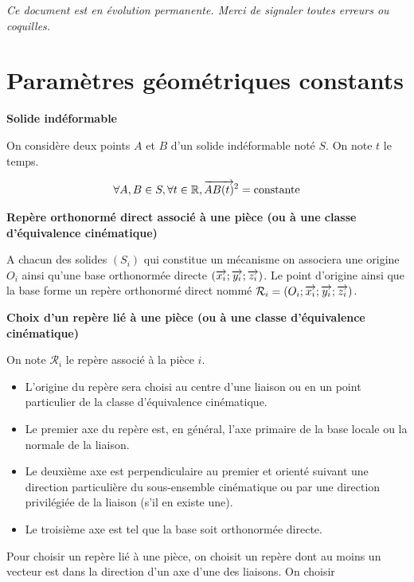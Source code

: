 \documentclass[10pt,oneside]{article}
\begin{document}
\setlength{\parskip}{0ex plus 0.2ex minus 0ex}
 \renewcommand{\contentsname}{}
 \renewcommand{\baselinestretch}{1}



\textit{Ce document est en évolution permanente. Merci de signaler toutes erreurs ou coquilles.}
\tableofcontents

 \renewcommand{\baselinestretch}{1.2}
\setlength{\parskip}{2ex plus 0.5ex minus 0.2ex}



\section{Paramètres géométriques constants}

\begin{defi}
\textbf{Solide indéformable}

On considère deux points $A$ et $B$ d'un solide indéformable noté $S$. On note $t$ le temps.

$$
\forall A,B \in S, \forall t\in \mathbb{R}, \overrightarrow{AB(t)}^2 = \text{constante}
$$

\end{defi}



\begin{defi}
\textbf{Repère orthonormé direct associé à une pièce (ou à une classe d'équivalence cinématique)}

A chacun des solides $(S_i)$ qui constitue un mécanisme on associera une origine $O_i$ ainsi qu'une base orthonormée directe $\left(\overrightarrow{x_i};\overrightarrow{y_i};\overrightarrow{z_i}\right)$. Le point d'origine ainsi que la base forme un repère orthonormé direct nommé $\mathcal{R}_i=\left(O_i;\overrightarrow{x_i};\overrightarrow{y_i};\overrightarrow{z_i}\right)$. 

\end{defi}

\begin{methode}
\textbf{Choix d'un repère lié à une pièce (ou à une classe d'équivalence cinématique)}

On note $\mathcal{R}_i$ le repère associé à la pièce $i$.

\begin{itemize}
\item L'origine du repère sera choisi au centre d'une liaison ou en un point particulier de la classe d'équivalence cinématique. 
\item Le premier axe du repère est, en général, l'axe primaire de la base locale ou la normale de la liaison.
\item Le deuxième axe est perpendiculaire au premier et orienté suivant une direction particulière du sous-ensemble cinématique ou par une direction privilégiée de la liaison (s'il en existe une).
\item Le troisième axe est tel que la base soit orthonormée directe. 
\end{itemize}

Pour choisir un repère lié à une pièce, on choisit un repère dont au moins un vecteur est dans la direction d'un axe d'une des liaisons.
On choisir 
\end{methode}
\end{document}
